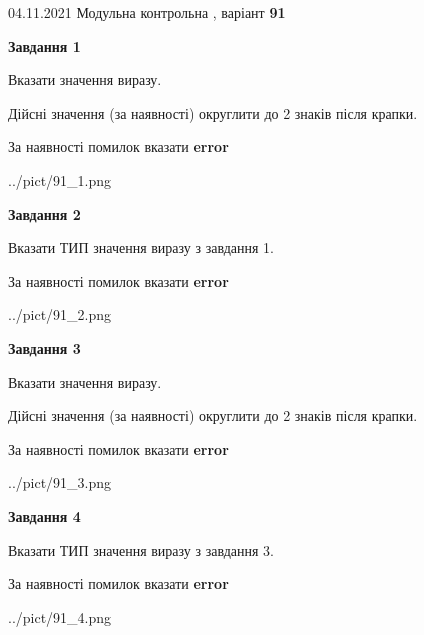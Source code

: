\documentclass[11pt, ukrainian]{article}
\begin{document}
{04.11.2021 Модульна контрольна , варіант  \No \textbf { 91 }\par}
{
\begin {large}
{\begin {center}\textbf{Завдання 1}\end {center}}\par
Вказати значення виразу. \par
Дійсні значення (за наявності) округлити до 2 знаків після крапки. \par
За наявності помилок вказати \textbf{error}

\begin{center}
	{../pict/91_1.png}
\end{center}
\newpage

{\begin {center}\textbf{Завдання 2}\end {center}}\par
Вказати ТИП значення виразу з завдання 1. \par
За наявності помилок вказати \textbf{error}

\begin{center}
	{../pict/91_2.png}
\end{center}
\newpage

{\begin {center}\textbf{Завдання 3}\end {center}}\par
Вказати значення виразу. \par
Дійсні значення (за наявності) округлити до 2 знаків після крапки. \par
За наявності помилок вказати \textbf{error}

\begin{center}
	{../pict/91_3.png}
\end{center}
\newpage

{\begin {center}\textbf{Завдання 4}\end {center}}\par
Вказати ТИП значення виразу з завдання 3. \par
За наявності помилок вказати \textbf{error}

\begin{center}
	{../pict/91_4.png}
\end{center}
\newpage


\end{large}}
\end{document}
